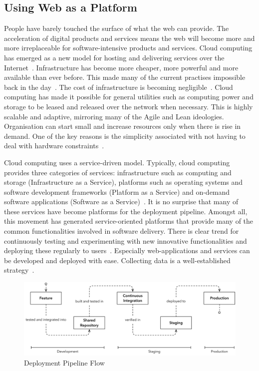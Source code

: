 \documentclass[english]{tktltiki2}
\begin{document}
\subsection{Using Web as a Platform}

People have barely touched the surface of what the web can provide. The acceleration of digital products and services means the web will become more and more irreplaceable for software-intensive products and services. Cloud computing has emerged as a new model for hosting and delivering services over the Internet~\cite{ZCB10}. Infrastructure has become more cheaper, more powerful and more available than ever before. This made many of the current practises impossible back in the day~\cite{Roy70}. The cost of infrastructure is becoming negligible~\cite{ZCB10, Bos12}. Cloud computing has made it possible for general utilities such as computing power and storage to be leased and released over the network when necessary. This is highly scalable and adaptive, mirroring many of the Agile and Lean ideologies. Organisation can start small and increase resources only when there is rise in demand. One of the key reasons is the simplicity associated with not having to deal with hardware constraints~\cite{BE12}.

Cloud computing uses a service-driven model. Typically, cloud computing provides three categories of services: infrastructure such as computing and storage (Infrastructure as a Service), platforms such as operating systems and software development frameworks (Platform as a Service) and on-demand software applications (Software as a Service)~\cite{ZCB10}. It is no surprise that many of these services have become platforms for the deployment pipeline. Amongst all, this movement has generated service-oriented platforms that provide many of the common functionalities involved in software delivery. There is clear trend for continuously testing and experimenting with new innovative functionalities and deploying these regularly to users~\cite{BE12}. Especially web-applications and services can be developed and deployed with ease. Collecting data is a well-established strategy~\cite{HB14}.

\begin{figure}[h!]

    \centering
    \vspace{1cm}

    \includegraphics[width = \textwidth]{figures/deployment-pipeline-flow}

    \caption{Deployment Pipeline Flow}
    \label{figure:deployment-pipeline-flow}

    \vspace{1cm}

\end{figure}
\end{document}
